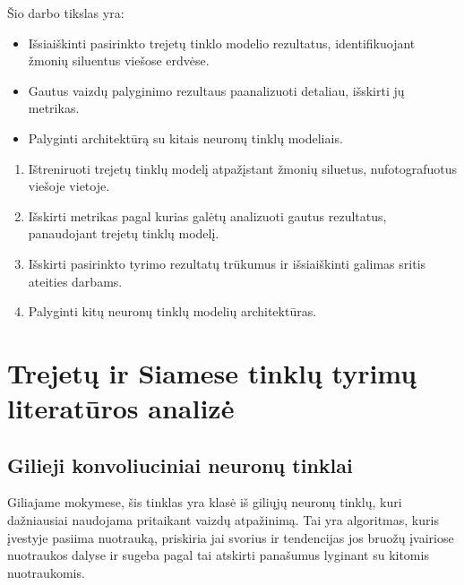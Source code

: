 \documentclass{VUMIFPSkursinis}
\begin{document}
\pagebreak
{}
Šio darbo tikslas yra:
\begin{itemize}
\item{Išsiaiškinti pasirinkto trejetų tinklo modelio rezultatus, identifikuojant žmonių siluentus viešose erdvėse.}
\item{Gautus vaizdų palyginimo rezultaus paanalizuoti detaliau, išskirti jų metrikas.}
\item{Palyginti architektūrą su kitais neuronų tinklų modeliais.}
\end{itemize}
 
\thispagestyle{empty}
\begin{enumerate}
\item{Ištreniruoti trejetų tinklų modelį atpažįstant žmonių siluetus, nufotografuotus viešoje vietoje.}
\item{ Išskirti metrikas pagal kurias galėtų analizuoti gautus rezultatus, panaudojant trejetų tinklų modelį.}
\item{Išskirti pasirinkto tyrimo rezultatų trūkumus ir išsiaiškinti galimas sritis ateities darbams.}
\item{Palyginti kitų neuronų tinklų modelių architektūras.}
\end{enumerate}

\pagebreak
\section{Trejetų ir Siamese tinklų tyrimų literatūros analizė}

\subsection{Gilieji konvoliuciniai neuronų tinklai}
Giliajame mokymese, šis tinklas yra klasė iš giliųjų neuronų tinklų, kuri dažniausiai naudojama pritaikant vaizdų atpažinimą. Tai yra algoritmas, kuris įvestyje pasiima nuotrauką, priskiria jai svorius ir tendencijas jos bruožų įvairiose nuotraukos dalyse ir sugeba pagal tai atskirti panašumus lyginant su kitomis nuotraukomis.
\end{document}
